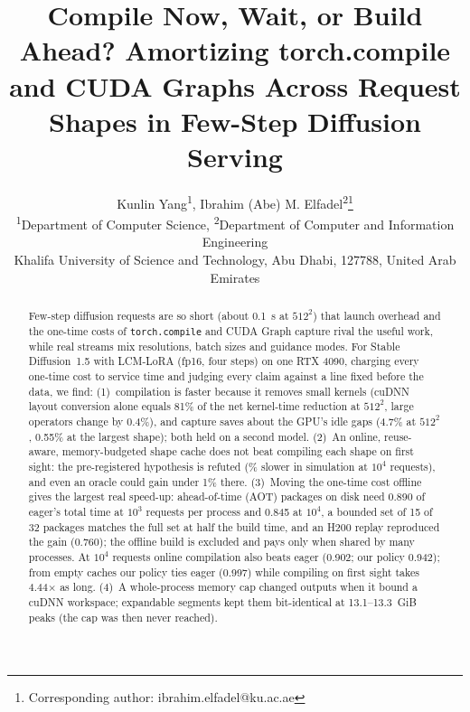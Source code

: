 \documentclass[conference]{IEEEtran}
\newcommand{\tn}[1]{#1}%
\begin{document}
\title{Compile Now, Wait, or Build Ahead? Amortizing torch.compile and CUDA Graphs Across Request Shapes in Few-Step Diffusion Serving}

\author{
Kunlin Yang\textsuperscript{1}, Ibrahim (Abe) M. Elfadel\textsuperscript{2}\thanks{Corresponding author: ibrahim.elfadel@ku.ac.ae} \\
\textsuperscript{1}Department of Computer Science, \textsuperscript{2}Department of Computer and Information Engineering \\
Khalifa University of Science and Technology, Abu Dhabi, 127788, United Arab Emirates
}

\maketitle

\begin{abstract}
\noindent Few-step diffusion requests are so short (about 0.1~s at $512^2$) that launch overhead and the one-time costs of \texttt{torch.compile} and CUDA Graph capture rival the useful work, while real streams mix resolutions, batch sizes and guidance modes. For Stable Diffusion~1.5 with LCM-LoRA (fp16, four steps) on one RTX 4090, charging every one-time cost to service time and judging every claim against a line fixed before the data, we find: (1)~compilation is faster because it removes small kernels (cuDNN layout conversion alone equals \tn{81\%} of the net kernel-time reduction at $512^2$, large operators change by \tn{0.4\%}), and capture saves about the GPU's idle gaps (\tn{4.7\%} at $512^2$, \tn{0.55\%} at the largest shape); both held on a second model. (2)~An online, reuse-aware, memory-budgeted shape cache does not beat compiling each shape on first sight: the pre-registered hypothesis is refuted (\NHfourAGapPctTenK\% slower in simulation at $10^4$ requests), and even an oracle could gain under \tn{1\%} there. (3)~Moving the one-time cost offline gives the largest real speed-up: ahead-of-time (AOT) packages on disk need \tn{0.890} of eager's total time at $10^3$ requests per process and \tn{0.845} at $10^4$, a bounded set of 15 of 32 packages matches the full set at half the build time, and an H200 replay reproduced the gain (\tn{0.760}); the offline build is excluded and pays only when shared by many processes. At $10^4$ requests online compilation also beats eager (\tn{0.902}; our policy \tn{0.942}); from empty caches our policy ties eager (\tn{0.997}) while compiling on first sight takes \tn{4.44}$\times$ as long. (4)~A whole-process memory cap changed outputs when it bound a cuDNN workspace; expandable segments kept them bit-identical at \tn{13.1--13.3}~GiB peaks (the cap was then never reached).
\end{abstract}
\end{document}
